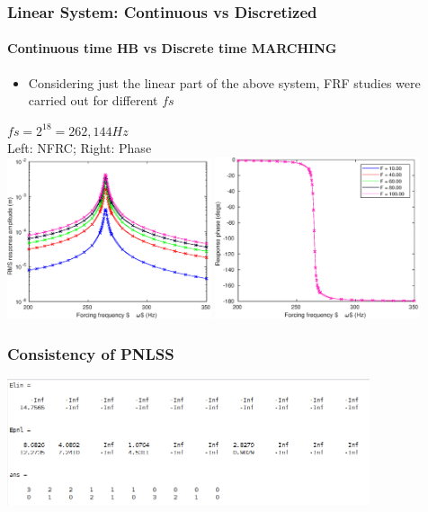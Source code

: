 \documentclass[9pt]{beamer}
\begin{document}
\begin{frame}
  \frametitle{Linear System: Continuous vs Discretized}
  \framesubtitle{Continuous time HB vs Discrete time MARCHING}
  \begin{itemize}
  \item Considering just the linear part of the above system, FRF
    studies were carried out for different $fs$
  \end{itemize}
  \begin{center}
    $fs = 2^{18} = 262,144 Hz$\\
   Left: NFRC; Right: Phase\\
   \includegraphics[width=0.45\textwidth]{../../benchmark0/fig/TMdssex_frf_Amp_fs262144}
   \includegraphics[width=0.45\textwidth]{../../benchmark0/fig/TMdssex_frf_Phase_fs262144}
  \end{center}  
\end{frame}

\begin{frame}
  \frametitle{Consistency of PNLSS}
  \includegraphics[width=0.8\textwidth]{./fig/consist}
\end{frame}

\end{document}
